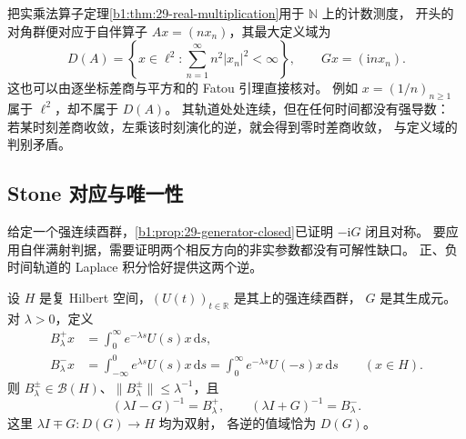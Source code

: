 把实乘法算子定理\cref{b1:thm:29-real-multiplication}用于 \(\mathbb N\) 上的计数测度，
开头的对角群便对应于自伴算子 \(Ax=(nx_n)\)，其最大定义域为
\[
 D(A)=\left\{x\in\ell^2:\sum_{n=1}^{\infty}n^2|x_n|^2<\infty\right\},
 \qquad Gx=(\mathrm i n x_n).
\]
这也可以由逐坐标差商与平方和的 Fatou 引理直接核对。
例如 \(x=(1/n)_{n\geq1}\) 属于 \(\ell^2\)，却不属于 \(D(A)\)。
其轨道处处连续，但在任何时间都没有强导数：
若某时刻差商收敛，左乘该时刻演化的逆，就会得到零时差商收敛，
与定义域的判别矛盾。

\subsection{Stone 对应与唯一性}
\label{b1:subsec:290804}

给定一个强连续酉群，\cref{b1:prop:29-generator-closed}已证明 \(-\mathrm iG\) 闭且对称。
要应用自伴满射判据，需要证明两个相反方向的非实参数都没有可解性缺口。
正、负时间轨道的 Laplace 积分恰好提供这两个逆。

\begin{lemma}[两侧 Laplace 公式]
\label{b1:lem:29-group-laplace}
设 \(H\) 是复 Hilbert 空间，\((U(t))_{t\in\mathbb R}\) 是其上的强连续酉群，
\(G\) 是其生成元。对 \(\lambda>0\)，定义
\[
 \begin{split}
 B_\lambda^+x&=\int_0^\infty e^{-\lambda s}U(s)x\,\mathrm ds,\\
 B_\lambda^-x&=\int_{-\infty}^0e^{\lambda s}U(s)x\,\mathrm ds
              =\int_0^\infty e^{-\lambda s}U(-s)x\,\mathrm ds
              \qquad(x\in H).
 \end{split}
\]
则 \(B_\lambda^\pm\in\mathcal B(H)\)、\(\|B_\lambda^\pm\|\leq\lambda^{-1}\)，且
\[
 (\lambda I-G)^{-1}=B_\lambda^+,\qquad
 (\lambda I+G)^{-1}=B_\lambda^-.
\]
这里 \(\lambda I\mp G:D(G)\to H\) 均为双射，
各逆的值域恰为 \(D(G)\)。
\end{lemma}

